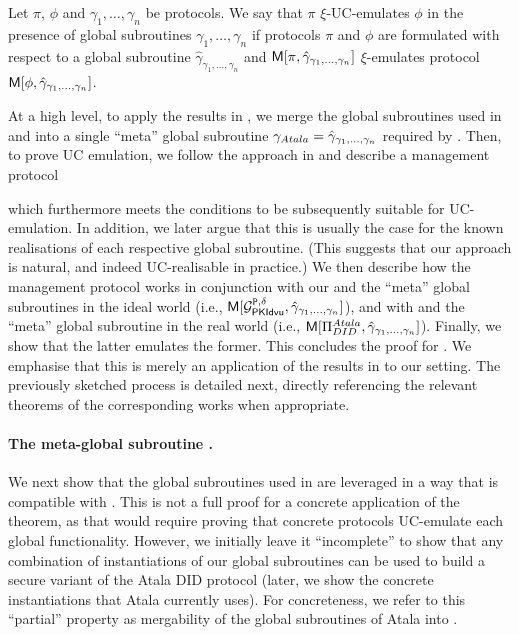 \begin{theorem}
  \label{thm:uc-bhz21}
  Let $\pi$, $\phi$ and $\gamma_1,\dots,\gamma_n$ be protocols. We say that
  $\pi$ $\xi$-UC-emulates $\phi$ in the presence of global subroutines
  $\gamma_1,\dots,\gamma_n$ if protocols $\pi$ and $\phi$ are formulated with
  respect to a global subroutine $\hat{\gamma}_{\gamma_1,\dots,\gamma_n}$ and
  $\mathsf{M}[\pi,\hat{\gamma}_{\gamma_1,\dots,\gamma_n}]$ $\xi$-emulates protocol
  $\mathsf{M}[\phi,\hat{\gamma}_{\gamma_1,\dots,\gamma_n}]$.
\end{theorem}

At a high level, to apply the results in \cite{bch+20,bhz21}, we merge the
global subroutines used in \IdealGPKIDID and \RealPKIDIDAtala into a single
``meta'' global subroutine $\gamma_{Atala} = \hat{\gamma}_{\gamma_1,\dots,\gamma_n}$
required by .
%
Then, to prove UC emulation, we follow the approach in \cite{bch+20} and
describe a management protocol \UCM

which furthermore meets the conditions to be
subsequently suitable for UC-emulation. In addition, we later argue that this is
usually the case for the known realisations of each respective global
subroutine. (This suggests that our approach is natural, and indeed
UC-realisable in practice.)
%
We then describe how the management protocol \UCM works in conjunction with
our \IdealGPKIDID and the ``meta'' global subroutines in the ideal world (i.e.,
$\mathsf{M}[\mathcal{G}^{\mathtt{P},\delta}_{\mathsf{PKIdvu}},\hat{\gamma}_{\gamma_1,\dots,\gamma_n}]$), and
with \RealPKIDIDAtala and the ``meta'' global subroutine in the real world
(i.e., $\mathsf{M}[\Pi_{DID}^{Atala},\hat{\gamma}_{\gamma_1,\dots,\gamma_n}]$).
%
Finally, we show that the latter emulates the former. This concludes the proof
for .
%
We emphasise that this is merely an application of the results in
\cite{bch+20,bhz21} to our setting. The previously sketched process is detailed
next, directly referencing the relevant theorems of the corresponding works when
appropriate.

\paragraph{The meta-global subroutine \gAtala.} %
We next show that the global subroutines used in \RealPKIDIDAtala are leveraged
in a way that is compatible with \cite[Theorem 4.3]{bhz21}. This is not a full
proof for a concrete application of the theorem, as that would require proving
that concrete protocols UC-emulate each global functionality. However, we
initially leave it ``incomplete'' to show that any combination of instantiations
of our global subroutines can be used to build a secure variant of the Atala
DID protocol (later, we show the concrete instantiations that Atala currently
uses). For concreteness, we refer to this ``partial'' property as mergability
of the global subroutines of Atala into \gAtala.


